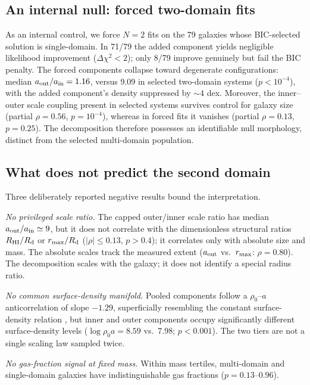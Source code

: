 \documentclass[twocolumn]{aastex631}
\begin{document}
\subsection{An internal null: forced two-domain fits} \label{sec:forced}

As an internal control, we force $N = 2$ fits on the 79 galaxies whose
BIC-selected solution is single-domain. In 71/79 the added component yields
negligible likelihood improvement ($\Delta\chi^2 < 2$); only 8/79 improve
genuinely but fail the BIC penalty. The forced components collapse toward
degenerate configurations: median $a_{\rm out}/a_{\rm in} = 1.16$, versus
9.09 in selected two-domain systems ($p < 10^{-4}$), with the added
component's density suppressed by $\sim$4 dex. Moreover, the inner--outer
scale coupling present in selected systems survives control for galaxy size
(partial $\rho = 0.56$, $p = 10^{-4}$), whereas in forced fits it vanishes
(partial $\rho = 0.13$, $p = 0.25$). The decomposition therefore possesses an
identifiable null morphology, distinct from the selected multi-domain
population.

\subsection{What does not predict the second domain} \label{sec:negatives}

Three deliberately reported negative results bound the interpretation.

\emph{No privileged scale ratio.} The capped outer/inner scale ratio has
median $a_{\rm out}/a_{\rm in} \simeq 9$, but it does not correlate with the
dimensionless structural ratios $R_{\rm HI}/R_{\rm d}$ or
$r_{\rm max}/R_{\rm d}$ ($|\rho| \le 0.13$, $p > 0.4$); it correlates only
with absolute size and mass. The absolute scales track the measured extent
($a_{\rm out}$ vs.\ $r_{\rm max}$: $\rho = 0.80$). The decomposition scales
with the galaxy; it does not identify a special radius ratio.

\emph{No common surface-density manifold.} Pooled components follow a
$\rho_0$--$a$ anticorrelation of slope $-1.29$, superficially resembling the
constant surface-density relation \citep{Donato2009}, but inner and outer
components occupy significantly different surface-density levels
($\log \rho_0 a = 8.59$ vs.\ $7.98$; $p < 0.001$). The two tiers are not a
single scaling law sampled twice.

\emph{No gas-fraction signal at fixed mass.} Within mass tertiles,
multi-domain and single-domain galaxies have indistinguishable gas fractions
($p = 0.13$--$0.96$).
\end{document}
